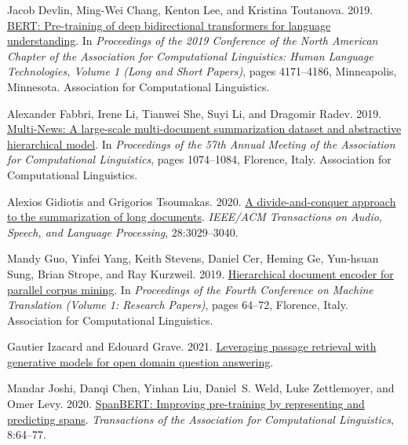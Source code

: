\documentclass[11pt]{article}
\begin{document}
\begin{thebibliography}{43}
Jacob Devlin, Ming-Wei Chang, Kenton Lee, and Kristina Toutanova. 2019.
\newblock \href {https://doi.org/10.18653/v1/N19-1423} {{BERT}: Pre-training of
  deep bidirectional transformers for language understanding}.
\newblock In \emph{Proceedings of the 2019 Conference of the North {A}merican
  Chapter of the Association for Computational Linguistics: Human Language
  Technologies, Volume 1 (Long and Short Papers)}, pages 4171--4186,
  Minneapolis, Minnesota. Association for Computational Linguistics.

Alexander Fabbri, Irene Li, Tianwei She, Suyi Li, and Dragomir Radev. 2019.
\newblock \href {https://doi.org/10.18653/v1/P19-1102} {Multi-{N}ews: A
  large-scale multi-document summarization dataset and abstractive hierarchical
  model}.
\newblock In \emph{Proceedings of the 57th Annual Meeting of the Association
  for Computational Linguistics}, pages 1074--1084, Florence, Italy.
  Association for Computational Linguistics.

Alexios Gidiotis and Grigorios Tsoumakas. 2020.
\newblock \href {https://doi.org/10.1109/TASLP.2020.3037401} {A
  divide-and-conquer approach to the summarization of long documents}.
\newblock \emph{IEEE/ACM Transactions on Audio, Speech, and Language
  Processing}, 28:3029--3040.

Mandy Guo, Yinfei Yang, Keith Stevens, Daniel Cer, Heming Ge, Yun-hsuan Sung,
  Brian Strope, and Ray Kurzweil. 2019.
\newblock \href {https://doi.org/10.18653/v1/W19-5207} {Hierarchical document
  encoder for parallel corpus mining}.
\newblock In \emph{Proceedings of the Fourth Conference on Machine Translation
  (Volume 1: Research Papers)}, pages 64--72, Florence, Italy. Association for
  Computational Linguistics.

Gautier Izacard and Edouard Grave. 2021.
\newblock \href {http://arxiv.org/abs/2007.01282} {Leveraging passage retrieval
  with generative models for open domain question answering}.

Mandar Joshi, Danqi Chen, Yinhan Liu, Daniel~S. Weld, Luke Zettlemoyer, and
  Omer Levy. 2020.
\newblock \href {https://doi.org/10.1162/tacl_a_00300} {{S}pan{BERT}: Improving
  pre-training by representing and predicting spans}.
\newblock \emph{Transactions of the Association for Computational Linguistics},
  8:64--77.


\end{thebibliography}
\end{document}
